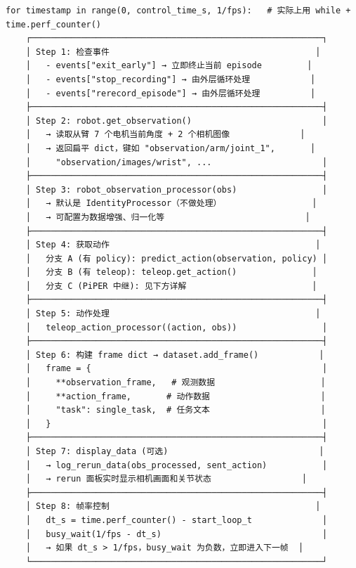 \documentclass[UTF8,a4paper,11pt]{ctexart}
\begin{document}
{\begin{lstlisting}[language=text]
for timestamp in range(0, control_time_s, 1/fps):   # 实际上用 while + time.perf_counter()
    ┌──────────────────────────────────────────────────────────┐
    │ Step 1: 检查事件                                         │
    │   - events["exit_early"] → 立即终止当前 episode         │
    │   - events["stop_recording"] → 由外层循环处理            │
    │   - events["rerecord_episode"] → 由外层循环处理          │
    ├──────────────────────────────────────────────────────────┤
    │ Step 2: robot.get_observation()                          │
    │   → 读取从臂 7 个电机当前角度 + 2 个相机图像              │
    │   → 返回扁平 dict，键如 "observation/arm/joint_1",       │
    │     "observation/images/wrist", ...                      │
    ├──────────────────────────────────────────────────────────┤
    │ Step 3: robot_observation_processor(obs)                 │
    │   → 默认是 IdentityProcessor（不做处理）                  │
    │   → 可配置为数据增强、归一化等                            │
    ├──────────────────────────────────────────────────────────┤
    │ Step 4: 获取动作                                         │
    │   分支 A (有 policy): predict_action(observation, policy) │
    │   分支 B (有 teleop): teleop.get_action()               │
    │   分支 C (PiPER 中继): 见下方详解                         │
    ├──────────────────────────────────────────────────────────┤
    │ Step 5: 动作处理                                         │
    │   teleop_action_processor((action, obs))                 │
    ├──────────────────────────────────────────────────────────┤
    │ Step 6: 构建 frame dict → dataset.add_frame()            │
    │   frame = {                                              │
    │     **observation_frame,   # 观测数据                     │
    │     **action_frame,       # 动作数据                      │
    │     "task": single_task,  # 任务文本                      │
    │   }                                                      │
    ├──────────────────────────────────────────────────────────┤
    │ Step 7: display_data (可选)                              │
    │   → log_rerun_data(obs_processed, sent_action)           │
    │   → rerun 面板实时显示相机画面和关节状态                  │
    ├──────────────────────────────────────────────────────────┤
    │ Step 8: 帧率控制                                         │
    │   dt_s = time.perf_counter() - start_loop_t              │
    │   busy_wait(1/fps - dt_s)                                │
    │   → 如果 dt_s > 1/fps，busy_wait 为负数，立即进入下一帧  │
    └──────────────────────────────────────────────────────────┘
\end{lstlisting}

}
\end{document}
